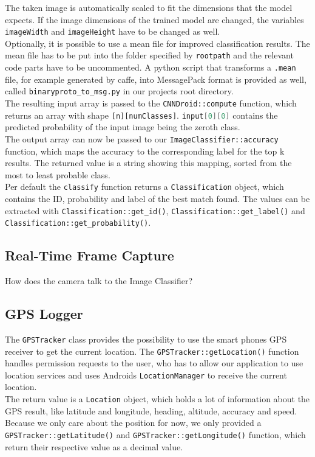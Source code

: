 The taken image is automatically scaled to fit the dimensions that the model expects. If the image dimensions of the trained model are changed, the variables \texttt{imageWidth} and \texttt{imageHeight} have to be changed as well.\\
Optionally, it is possible to use a mean file for improved classification results. The mean file has to be put into the folder specified by \texttt{rootpath} and the relevant code parts have to be uncommented. A python script that transforms a \texttt{.mean} file, for example generated by caffe, into MessagePack format is provided as well, called \texttt{binaryproto\_to\_msg.py} in our projects root directory.\\
The resulting input array is passed to the \texttt{CNNDroid::compute} function, which returns an array with shape \texttt{[n][numClasses]}. \lstinline[language=Java]{input[0][0]} contains the predicted probability of the input image being the zeroth class.\\
The output array can now be passed to our \texttt{ImageClassifier::accuracy} function, which maps the accuracy to the corresponding label for the top k results. The returned value is a string showing this mapping, sorted from the most to least probable class.\\
Per default the \texttt{classify} function returns a \texttt{Classification} object, which contains the ID, probability and label of the best match found. The values can be extracted with \texttt{Classification::get\_id()}, \texttt{Classification::get\_label()} and \texttt{Classification::get\_probability()}.

\subsection {Real-Time Frame Capture}
How does the camera talk to the Image Classifier?

\subsection {GPS Logger}
The \texttt{GPSTracker} class provides the possibility to use the smart phones GPS receiver to get the current location. The \texttt{GPSTracker::getLocation()} function handles permission requests to the user, who has to allow our application to use location services and uses Androids \texttt{LocationManager} to receive the current location.\\
The return value is a \texttt{Location} object, which holds a lot of information about the GPS result, like latitude and longitude, heading, altitude, accuracy and speed. Because we only care about the position for now, we only provided a \texttt{GPSTracker::getLatitude()} and \texttt{GPSTracker::getLongitude()} function, which return their respective value as a decimal value.

